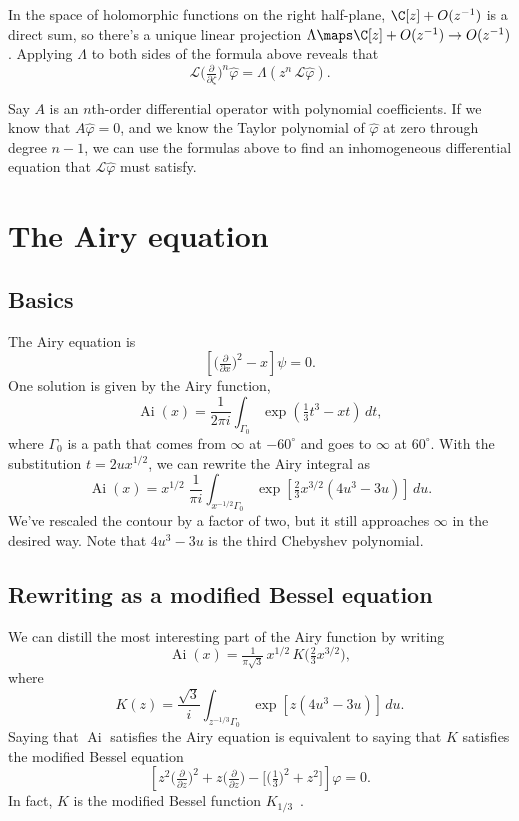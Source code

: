 \documentclass{article}
\theoremstyle{definition}
\theoremstyle{plain}
\newcommand{\laplace}{\mathcal{L}}
\DeclareMathOperator{\Ai}{Ai}
\begin{document}
In the space of holomorphic functions on the right half-plane, $\C[z] + O(z^{-1})$ is a direct sum, so there's a unique linear projection $\Lambda \maps \C[z] + O(z^{-1}) \to O(z^{-1})$. Applying $\Lambda$ to both sides of the formula above reveals that
\[ \laplace \big(\tfrac{\partial}{\partial \zeta}\big)^n \hat{\varphi} = \Lambda (z^n\,\laplace \hat{\varphi}). \]

Say $A$ is an $n$th-order differential operator with polynomial coefficients. If we know that $A\hat{\varphi} = 0$, and we know the Taylor polynomial of $\hat{\varphi}$ at zero through degree $n - 1$, we can use the formulas above to find an inhomogeneous differential equation that $\laplace \hat{\varphi}$ must satisfy.
\section{The Airy equation}
\subsection{Basics}
The Airy equation is
\begin{equation}\label{eqn:airy}
\left[\big(\tfrac{\partial}{\partial x}\big)^2 - x\right] \psi = 0.
\end{equation}
One solution is given by the Airy function,
\[ \Ai(x) = \frac{1}{2\pi i} \int_{\Gamma_0} \exp\left(\tfrac{1}{3}t^3 - xt\right)\,dt, \]
where $\Gamma_0$ is a path that comes from $\infty$ at $-60^\circ$ and goes to $\infty$ at $60^\circ$. With the substitution $t = 2ux^{1/2}$, we can rewrite the Airy integral as
\[ \Ai(x) = x^{1/2}\;\frac{1}{\pi i} \int_{x^{-1/2} \Gamma_0} \exp\left[\tfrac{2}{3}x^{3/2} \left(4u^3 - 3u\right)\right]\,du. \]
We've rescaled the contour by a factor of two, but it still approaches $\infty$ in the desired way. Note that $4u^3 - 3u$ is the third Chebyshev polynomial.
\subsection{Rewriting as a modified Bessel equation}
We can distill the most interesting part of the Airy function by writing
\[ \Ai(x) = \tfrac{1}{\pi\sqrt{3}}\,x^{1/2}\, K\big(\tfrac{2}{3} x^{3/2}\big), \]
where
\[ K(z) = \frac{\sqrt{3}}{i} \int_{z^{-1/3}\Gamma_0} \exp\left[z \left(4u^3 - 3u\right)\right]\,du. \]
Saying that $\Ai$ satisfies the Airy equation is equivalent to saying that $K$ satisfies the modified Bessel equation
\begin{equation}\label{eqn:modbessel}
\left[z^2 \big(\tfrac{\partial}{\partial z}\big)^2 + z \big(\tfrac{\partial}{\partial z}\big) - \big[\big(\tfrac{1}{3}\big)^2 + z^2\big]\right] \varphi = 0.
\end{equation}
In fact, $K$ is the modified Bessel function $K_{1/3}$~\cite[equation~9.6.1]{dlmf}.
\end{document}
